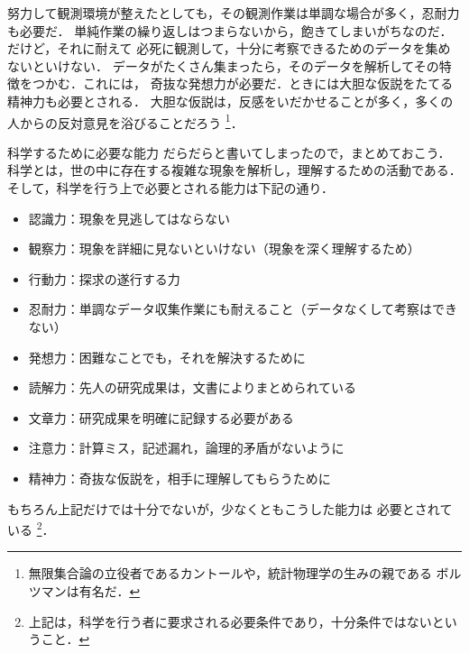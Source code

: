             努力して観測環境が整えたとしても，その観測作業は単調な場合が多く，忍耐力も必要だ．
            単純作業の繰り返しはつまらないから，飽きてしまいがちなのだ．だけど，それに耐えて
            必死に観測して，十分に考察できるためのデータを集めないといけない．
            データがたくさん集まったら，そのデータを解析してその特徴をつかむ．これには，
            奇抜な発想力が必要だ．ときには大胆な仮説をたてる精神力も必要とされる．
            大胆な仮説は，反感をいだかせることが多く，多くの人からの反対意見を浴びることだろう
                \footnote{
                    無限集合論の立役者であるカントールや，統計物理学の生みの親である
                    ボルツマンは有名だ．
                }．

            \begin{memo}{科学するために必要な能力}
                だらだらと書いてしまったので，まとめておこう．
                科学とは，世の中に存在する複雑な現象を解析し，理解するための活動である．
                そして，科学を行う上で必要とされる能力は下記の通り．
                \begin{itemize}
                    \item 認識力：現象を見逃してはならない
                    \item 観察力：現象を詳細に見ないといけない（現象を深く理解するため）
                    \item 行動力：探求の遂行する力
                    \item 忍耐力：単調なデータ収集作業にも耐えること（データなくして考察はできない）
                    \item 発想力：困難なことでも，それを解決するために
                    \item 読解力：先人の研究成果は，文書によりまとめられている
                    \item 文章力：研究成果を明確に記録する必要がある
                    \item 注意力：計算ミス，記述漏れ，論理的矛盾がないように
                    \item 精神力：奇抜な仮説を，相手に理解してもらうために
                \end{itemize}

                もちろん上記だけでは十分でないが，少なくともこうした能力は
                必要とされている
                    \footnote{
                        上記は，科学を行う者に要求される必要条件であり，十分条件ではないということ．
                    }．
            \end{memo}

